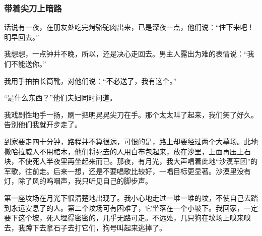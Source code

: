 \subsubsection*{带着尖刀上暗路}
\par 话说有一夜，在朋友处吃完烤骆驼肉出来，已是深夜一点，他们说：“住下来吧！明早回去。”
\par 我想想，一点钟并不晚，所以，还是决心走回去。男主人露出为难的表情说：“我们不能送你。”
\par 我用手拍拍长筒靴，对他们说：“不必送了，我有这个。”
\par “是什么东西？”他们夫妇同时问道。
\par 我戏剧性地手一扬，刷一把明晃晃尖刀在手。那个太太叫了起来，我们笑了好久。告别他们我就开步走了。
\par 到家要走四十分钟，路程并不算很远，可恨的是，路上却要经过两个大墓场。此地撒哈拉威人不用棺木，他们将死去的人用白布包起来，放在沙里，上面再压上石块，不使死人半夜里再坐起来而已。那夜，有月光，我大声唱着此地“沙漠军团”的军歌，往前走。后来一想，还是不要唱歌比较好，一唱目标更显著。沙漠里没有灯，除了风的呜咽声，我只听见自己的脚步声。
\par 第一座坟场在月光下很清楚地出现了。我小心地走过一堆一堆的坟，不使自己去踏到永远安息了的人。第二个坟场可有困难了，它坐落在一个小坡下。我回家，一定要下这个坡，死人埋得密密的，几乎无路可走。不远处，几只狗在坟场上嗅来嗅去，我蹲下去拿石子去打它们，狗号叫起来逃掉了。
